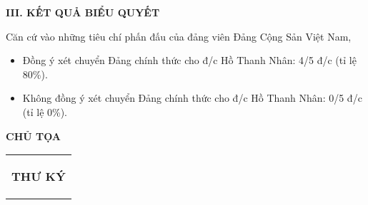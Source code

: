 \documentclass[]{article}
\begin{document}
\textbf{III. KẾT QUẢ BIỂU QUYẾT}

Căn cứ vào những tiêu chí phấn đấu của đảng viên Đảng Cộng Sản Việt Nam,

\begin{itemize}
\item
  Đồng ý xét chuyển Đảng chính thức cho đ/c Hồ Thanh Nhân: 4/5 đ/c (tỉ
  lệ 80\%).
\item
  Không đồng ý xét chuyển Đảng chính thức cho đ/c Hồ Thanh Nhân: 0/5 đ/c
  (tỉ lệ 0\%).
\end{itemize}


\begin{minipage}{0.45\textwidth}
\begin{center}
\textbf{CHỦ TỌA}
\end{center}

\end{minipage}%
\hfill
\begin{minipage}{0.45\textwidth}
\begin{tabular}{p{\textwidth}}
\begin{center}
\textbf{THƯ KÝ}
\end{center}
\end{tabular}
\end{minipage}%
\end{document}
